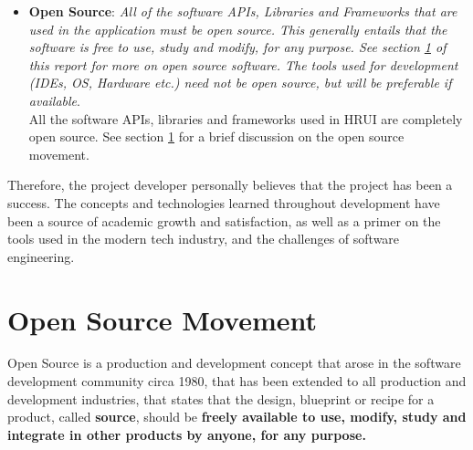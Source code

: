 \begin{itemize}
\begin{itemize}
		\end{itemize}
	\item \textbf{Open Source}: \textit{All of the software APIs, Libraries and Frameworks that are used in the application 
	must be open source. This generally entails that the software is free to use, study and modify, for any purpose. See 
	section \ref{opensourcemovement} of this report for more on open source software. The tools used for development (IDEs, 
	OS, Hardware etc.) need not be open source, but will be preferable if available}.\\

	All the software APIs, libraries and frameworks used in HRUI are completely open source. See section 
	\ref{opensourcemovement} for a brief discussion on the open source movement.
\end{itemize}

Therefore, the project developer personally believes that the project has been a success. The concepts and technologies 
learned throughout development have been a source of academic growth and satisfaction, as well as a primer on the tools 
used in the modern tech industry, and the challenges of software engineering.\\
\newpage
\section{Open Source Movement} \label{opensourcemovement}
Open Source is a production and development concept that arose in the software development community circa 1980, that has 
been extended to all production and development industries, that states that the design, blueprint or recipe for a product, 
called \textbf{source}, should be \textbf{freely available to use, modify, study and integrate in other products by anyone, 
for any purpose.}\\

